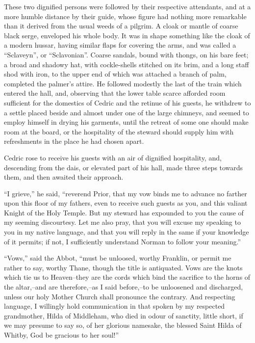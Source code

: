 These two dignified persons were followed by their respective
attendants, and at a more humble distance by their guide, whose figure
had nothing more remarkable than it derived from the usual weeds of a
pilgrim. A cloak or mantle of coarse black serge, enveloped his whole
body. It was in shape something like the cloak of a modern hussar,
having similar flaps for covering the arms, and was called a
``Sclaveyn'', or ``Sclavonian''. Coarse sandals, bound with thongs, on
his bare feet; a broad and shadowy hat, with cockle-shells stitched on
its brim, and a long staff shod with iron, to the upper end of which was
attached a branch of palm, completed the palmer's attire. He followed
modestly the last of the train which entered the hall, and, observing
that the lower table scarce afforded room sufficient for the domestics
of Cedric and the retinue of his guests, he withdrew to a settle placed
beside and almost under one of the large chimneys, and seemed to employ
himself in drying his garments, until the retreat of some one should
make room at the board, or the hospitality of the steward should supply
him with refreshments in the place he had chosen apart.

Cedric rose to receive his guests with an air of dignified hospitality,
and, descending from the dais, or elevated part of his hall, made three
steps towards them, and then awaited their approach.

``I grieve,'' he said, ``reverend Prior, that my vow binds me to advance
no farther upon this floor of my fathers, even to receive such guests as
you, and this valiant Knight of the Holy Temple. But my steward has
expounded to you the cause of my seeming discourtesy. Let me also pray,
that you will excuse my speaking to you in my native language, and that
you will reply in the same if your knowledge of it permits; if not, I
sufficiently understand Norman to follow your meaning.''

``Vows,'' said the Abbot, ``must be unloosed, worthy Franklin, or permit
me rather to say, worthy Thane, though the title is antiquated. Vows are
the knots which tie us to Heaven--they are the cords which bind the
sacrifice to the horns of the altar,--and are therefore,--as I said
before,--to be unloosened and discharged, unless our holy Mother Church
shall pronounce the contrary. And respecting language, I willingly hold
communication in that spoken by my respected grandmother, Hilda of
Middleham, who died in odour of sanctity, little short, if we may
presume to say so, of her glorious namesake, the blessed Saint Hilda of
Whitby, God be gracious to her soul!''

